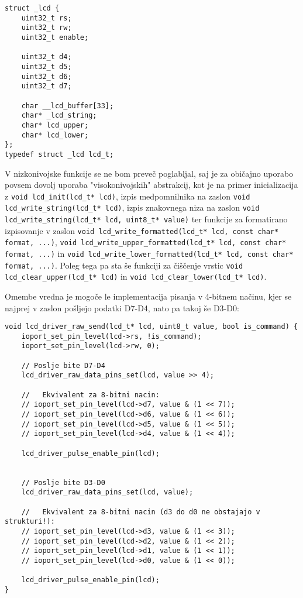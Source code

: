 \documentclass[12pt,a4paper,twoside,openright,slovene]{book}
\begin{document}
\lstset{language=C,numberstyle=\tiny}
\begin{lstlisting}
struct _lcd {
    uint32_t rs;
    uint32_t rw;
    uint32_t enable;

    uint32_t d4;
    uint32_t d5;
    uint32_t d6;
    uint32_t d7;

    char __lcd_buffer[33];
    char* _lcd_string;
    char* lcd_upper;
    char* lcd_lower;
};
typedef struct _lcd lcd_t;
\end{lstlisting}

V nizkonivojske funkcije se ne bom preveč poglabljal, saj je za običajno uporabo povsem dovolj uporaba "visokonivojskih" abstrakcij, kot je na primer inicializacija z \lstinline{void lcd_init(lcd_t* lcd)}, izpis medpomnilnika na zaslon \lstinline{void lcd_write_string(lcd_t* lcd)}, izpis znakovnega niza na zaslon \lstinline{void lcd_write_string(lcd_t* lcd, uint8_t* value)} ter funkcije za formatirano izpisovanje v zaslon \lstinline{void lcd_write_formatted(lcd_t* lcd, const char* format, ...)}, \lstinline{void lcd_write_upper_formatted(lcd_t* lcd, const char* format, ...)} in \lstinline{void lcd_write_lower_formatted(lcd_t* lcd, const char* format, ...)}. Poleg tega pa sta še funkciji za čiščenje vrstic \lstinline{void lcd_clear_upper(lcd_t* lcd)} in \lstinline{void lcd_clear_lower(lcd_t* lcd)}.

Omembe vredna je mogoče le implementacija pisanja v 4-bitnem načinu, kjer se najprej v zaslon pošljejo podatki D7-D4, nato pa takoj še D3-D0:

\begin{lstlisting}
void lcd_driver_raw_send(lcd_t* lcd, uint8_t value, bool is_command) {
    ioport_set_pin_level(lcd->rs, !is_command);
    ioport_set_pin_level(lcd->rw, 0);

    // Poslje bite D7-D4
    lcd_driver_raw_data_pins_set(lcd, value >> 4);

    //   Ekvivalent za 8-bitni nacin:
    // ioport_set_pin_level(lcd->d7, value & (1 << 7));
    // ioport_set_pin_level(lcd->d6, value & (1 << 6));
    // ioport_set_pin_level(lcd->d5, value & (1 << 5));
    // ioport_set_pin_level(lcd->d4, value & (1 << 4));

    lcd_driver_pulse_enable_pin(lcd);


    // Poslje bite D3-D0
    lcd_driver_raw_data_pins_set(lcd, value);

    //   Ekvivalent za 8-bitni nacin (d3 do d0 ne obstajajo v strukturi!):
    // ioport_set_pin_level(lcd->d3, value & (1 << 3));
    // ioport_set_pin_level(lcd->d2, value & (1 << 2));
    // ioport_set_pin_level(lcd->d1, value & (1 << 1));
    // ioport_set_pin_level(lcd->d0, value & (1 << 0));

    lcd_driver_pulse_enable_pin(lcd);
}
\end{lstlisting}
\end{document}
